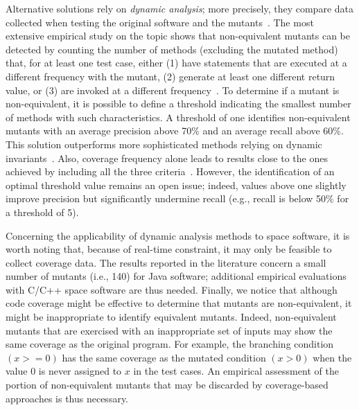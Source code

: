 Alternative solutions rely on \emph{dynamic analysis}; more precisely, they compare data collected when testing the original software and the mutants~\cite{grun2009impact,schuler2010covering,schuler2013covering,schuler2009efficient}.
The most extensive empirical study on the topic shows that non-equivalent mutants can be detected by counting the number of methods (excluding the mutated method) that, for at least one test case, either (1) have statements that are executed at a different frequency with the mutant, (2) generate at least one different return value, or (3) are invoked at a different frequency~\cite{schuler2013covering}. To determine if a mutant is non-equivalent, it is possible to define a threshold indicating the smallest number of methods with such characteristics. A threshold of one identifies non-equivalent mutants with an average precision above 70\% and an average recall above 60\%. This solution outperforms more sophisticated methods relying on dynamic invariants~\cite{schuler2009efficient}. Also, coverage frequency alone leads to results close to the ones achieved by including all the three criteria~\cite{schuler2013covering}.
However, the identification of an optimal threshold value remains an open issue; indeed, values above one slightly improve precision but significantly undermine recall (e.g., recall is below 50\% for a threshold of 5). 

Concerning the applicability of dynamic analysis methods to space software, it is worth noting that, because of real-time constraint, it may only be feasible to collect coverage data. 
The  results reported in the literature concern a small number of mutants (i.e., 140) for Java software; 
additional empirical evaluations with C/C++ space software are thus needed.
Finally, we notice that although code coverage might be effective to determine that mutants are non-equivalent, it might be inappropriate to identify equivalent mutants. Indeed, 
non-equivalent mutants that are exercised with an inappropriate set of inputs may show the same coverage as the original program. For example, the branching condition $(x >= 0)$ has the same coverage as the mutated condition $(x > 0)$ when the value $0$ is never assigned to $x$ in the test cases. 
An empirical assessment of the portion of non-equivalent mutants that may be discarded by coverage-based approaches is thus necessary.

